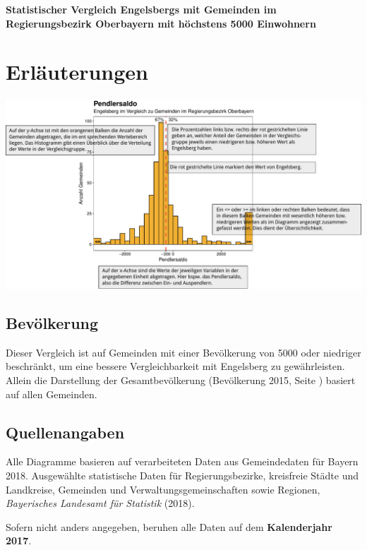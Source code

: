 \documentclass[11pt]{article}
\begin{document}
\begin{center}
	\Huge \textbf{Statistischer Vergleich Engelsbergs mit Gemeinden im Regierungsbezirk Oberbayern mit höchstens 5000 Einwohnern}
\end{center}
\pagebreak

\renewcommand{\contentsname}{Inhalt}
\tableofcontents

\pagebreak
\section{Erläuterungen}
\includegraphics[width=\textwidth]{../plot_explanations}

\vfill

\subsection*{Bevölkerung}
Dieser Vergleich ist auf Gemeinden mit einer Bevölkerung von 5000 oder niedriger beschränkt, um eine bessere Vergleichbarkeit mit Engelsberg zu gewährleisten. Allein die Darstellung der Gesamtbevölkerung (Bevölkerung 2015, Seite \pageref{plot:bevoelkerung.insgesamt}) basiert auf allen Gemeinden.

\subsection*{Quellenangaben}
Alle Diagramme basieren auf verarbeiteten Daten aus Gemeindedaten für Bayern 2018. Ausgewählte statistische Daten für Regierungsbezirke, kreisfreie Städte und Landkreise, Gemeinden und Verwaltungsgemeinschaften sowie Regionen, \textit{Bayerisches Landesamt für Statistik} (2018).

Sofern nicht anders angegeben, beruhen alle Daten auf dem \textbf{Kalenderjahr 2017}.

\pagebreak
\end{document}
